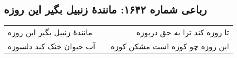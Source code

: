 \begin{center}
\section*{رباعی شماره ۱۶۴۲: مانندهٔ زنبیل بگیر این روزه}
\label{sec:1642}
\begin{longtable}{l p{0.5cm} r}
مانندهٔ زنبیل بگیر این روزه
&&
تا روزه کند ترا به حق دریوزه
\\
آب حیوان خنک کند دلسوزه
&&
این روزه چو کوزه است مشکن کوزه
\\
\end{longtable}
\end{center}
